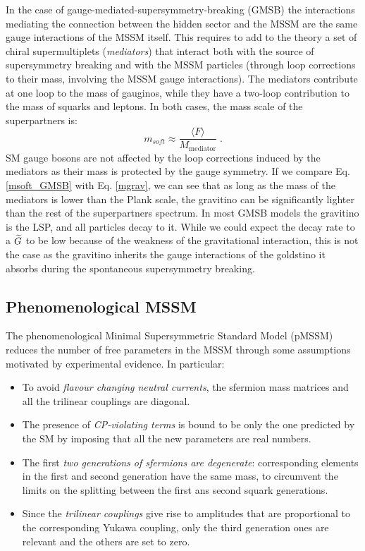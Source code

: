 In the case of gauge-mediated-supersymmetry-breaking (GMSB) \cite{Dine:1981gu}\cite{AlvarezGaume:1981wy}\cite{Nappi:1982hm}\cite{PhysRevD.48.1277}\cite{Dine:1994vc}\cite{Dine:1995ag} the interactions mediating the connection between the hidden sector and the MSSM are the same gauge interactions of the MSSM itself. This requires to add to the theory a set of chiral supermultiplets (\textit{mediators}) that interact both with the source of supersymmetry breaking and with the MSSM particles (through loop corrections to their mass, involving the MSSM gauge interactions). The mediators contribute at one loop to the mass of gauginos, while they have a two-loop contribution to the mass of squarks and leptons. In both cases, the mass scale of the superpartners is:
\begin{equation}
m_{soft} \approx \frac{\langle F \rangle}{M_\mathrm{mediator}} \; .
\label{msoft_GMSB}
\end{equation}
SM gauge bosons are not affected by the loop corrections induced by the mediators as their mass is protected by the gauge symmetry.
If we compare Eq. \ref{msoft_GMSB} with Eq. \ref{mgrav}, we can see that as long as the mass of the mediators is lower than the Plank scale, the gravitino can be significantly lighter than the rest of the superpartners spectrum. In most GMSB models the gravitino is the LSP, and all particles decay to it. While we could expect the decay rate to a $\widetilde{G}$ to be low because of the weakness of the gravitational interaction, this is not the case as the gravitino inherits the gauge interactions of the goldstino it absorbs during the spontaneous supersymmetry breaking.  


\subsection{Phenomenological MSSM}

The phenomenological Minimal Supersymmetric Standard Model (pMSSM) \cite{Djouadi:1998di} reduces the number of free parameters in the MSSM through some assumptions motivated by experimental evidence. In particular:
\begin{itemize}
\item To avoid \textit{flavour changing neutral currents}, the sfermion mass matrices and all the trilinear couplings are diagonal. 
\item The presence of \textit{CP-violating terms} is bound to be only the one predicted by the SM by imposing that all the new parameters are real numbers.
\item The first \textit{two generations of sfermions are degenerate}: corresponding elements in the first and second generation have the same mass, to circumvent the limits on the splitting between the first ans second squark generations.
\item Since the \textit{trilinear couplings} give rise to amplitudes that are proportional to the corresponding Yukawa coupling, only the third generation ones are relevant and the others are set to zero.
\end{itemize}

